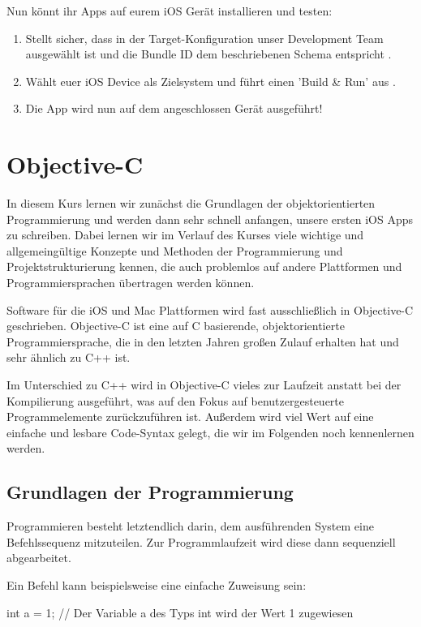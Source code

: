 \documentclass[parskip=half, final]{scrreprt}
\begin{document}
Nun könnt ihr Apps auf eurem iOS Gerät installieren und testen:
\begin{enumerate}
\item Stellt sicher, dass in der Target-Konfiguration unser Development Team ausgewählt ist und die Bundle ID dem beschriebenen Schema entspricht .
\item Wählt euer iOS Device als Zielsystem und führt einen 'Build \& Run' aus .
\item Die App wird nun auf dem angeschlossen Gerät ausgeführt!
\end{enumerate}


\chapter{Objective-C}

In diesem Kurs lernen wir zunächst die Grundlagen der objektorientierten Programmierung und werden dann sehr schnell anfangen, unsere ersten iOS Apps zu schreiben. Dabei lernen wir im Verlauf des Kurses viele wichtige und allgemeingültige Konzepte und Methoden der Programmierung und Projektstrukturierung kennen, die auch problemlos auf andere Plattformen und Programmiersprachen übertragen werden können.

Software für die iOS und Mac Plattformen wird fast ausschließlich in Objective-C geschrieben. Objective-C ist eine auf C basierende, objektorientierte Programmiersprache, die in den letzten Jahren großen Zulauf erhalten hat und sehr ähnlich zu C++ ist.

Im Unterschied zu C++ wird in Objective-C vieles zur Laufzeit anstatt bei der Kompilierung ausgeführt, was auf den Fokus auf benutzergesteuerte Programmelemente zurückzuführen ist. Außerdem wird viel Wert auf eine einfache und lesbare Code-Syntax gelegt, die wir im Folgenden noch kennenlernen werden.

\section{Grundlagen der Programmierung}

Programmieren besteht letztendlich darin, dem ausführenden System eine Befehlssequenz mitzuteilen. Zur Programmlaufzeit wird diese dann sequenziell abgearbeitet.

Ein Befehl kann beispielsweise eine einfache Zuweisung sein:
\begin{objclst}
int a = 1; // Der Variable a des Typs int wird der Wert 1 zugewiesen
\end{objclst}
\end{document}
